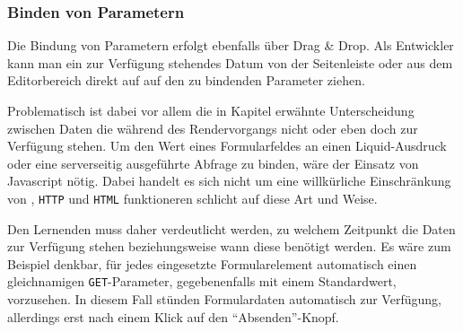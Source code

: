 \subsubsection{Binden von Parametern}
\label{sec:ui-editor-params}

Die Bindung von Parametern erfolgt ebenfalls über Drag \& Drop. Als Entwickler kann man ein zur Verfügung stehendes Datum von der Seitenleiste oder aus dem Editorbereich direkt auf auf den zu bindenden Parameter ziehen.

Problematisch ist dabei vor allem die in Kapitel  erwähnte Unterscheidung zwischen Daten die während des Rendervorgangs nicht oder eben doch zur Verfügung stehen. Um den Wert eines Formularfeldes an einen Liquid-Ausdruck oder eine serverseitig ausgeführte Abfrage zu binden, wäre der Einsatz von Javascript nötig. Dabei handelt es sich nicht um eine willkürliche Einschränkung von \idename{}, \texttt{HTTP} und \texttt{HTML} funktioneren schlicht auf diese Art und Weise.

Den Lernenden muss daher verdeutlicht werden, zu welchem Zeitpunkt die Daten zur Verfügung stehen beziehungsweise wann diese benötigt werden. Es wäre zum Beispiel denkbar, für jedes eingesetzte Formularelement automatisch einen gleichnamigen \texttt{GET}-Parameter, gegebenenfalls mit einem Standardwert, vorzusehen. In diesem Fall stünden Formulardaten automatisch zur Verfügung, allerdings erst nach einem Klick auf den "`Absenden"'-Knopf.

